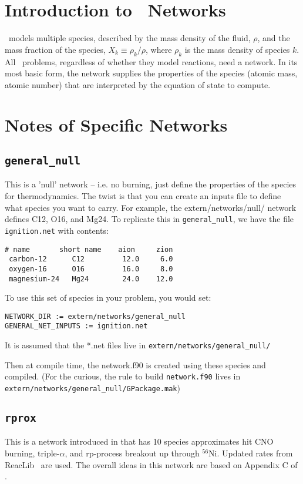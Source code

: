 \section{Introduction to \maestro\ Networks}

\maestro\ models multiple species, described by the mass density of
the fluid, $\rho$, and the mass fraction of the species, $X_k \equiv
\rho_k/\rho$, where $\rho_k$ is the mass density of species $k$.  All
\maestro\ problems, regardless of whether they model reactions, need a
network.  In its most basic form, the network supplies the properties
of the species (atomic mass, atomic number) that are interpreted by
the equation of state to compute.

\section{Notes of Specific Networks}

\subsection{{\tt general\_null}}

This is a 'null' network -- i.e. no burning, just define the
properties of the species for thermodynamics.  The twist is that you
can create an inputs file to define what species you want to carry.
For example, the extern/networks/null/ network defines C12, O16, and
Mg24.  To replicate this in {\tt general\_null}, we have the file
{\tt ignition.net} with contents:

\begin{verbatim}
# name       short name    aion     zion
 carbon-12      C12         12.0     6.0
 oxygen-16      O16         16.0     8.0
 magnesium-24   Mg24        24.0    12.0
\end{verbatim}

To use this set of species in your problem, you would set:

\begin{verbatim}
NETWORK_DIR := extern/networks/general_null
GENERAL_NET_INPUTS := ignition.net
\end{verbatim}

It is assumed that the *.net files live in {\tt extern/networks/general\_null/}

Then at compile time, the network.f90 is created using these species and
compiled.  (For the curious, the rule to build {\tt network.f90} lives in
{\tt extern/networks/general\_null/GPackage.mak})


\subsection{{\tt rprox}}

This is a network introduced in \cite{xrb2} that has 10 species
approximates hit CNO burning, triple-$\alpha$, and rp-process 
breakout up through $^{56}\mathrm{Ni}$.  Updated rates from
ReacLib~\cite{ReacLib} are used.  The overall ideas in this 
network are based on Appendix C of \cite{wallacewoosley:1981}.
